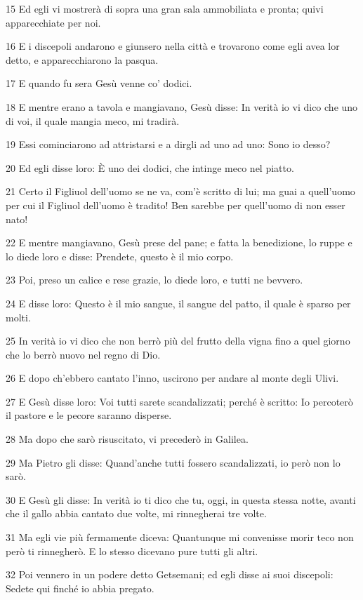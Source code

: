 \par 15 Ed egli vi mostrerà di sopra una gran sala ammobiliata e pronta; quivi apparecchiate per noi.
\par 16 E i discepoli andarono e giunsero nella città e trovarono come egli avea lor detto, e apparecchiarono la pasqua.
\par 17 E quando fu sera Gesù venne co' dodici.
\par 18 E mentre erano a tavola e mangiavano, Gesù disse: In verità io vi dico che uno di voi, il quale mangia meco, mi tradirà.
\par 19 Essi cominciarono ad attristarsi e a dirgli ad uno ad uno: Sono io desso?
\par 20 Ed egli disse loro: È uno dei dodici, che intinge meco nel piatto.
\par 21 Certo il Figliuol dell'uomo se ne va, com'è scritto di lui; ma guai a quell'uomo per cui il Figliuol dell'uomo è tradito! Ben sarebbe per quell'uomo di non esser nato!
\par 22 E mentre mangiavano, Gesù prese del pane; e fatta la benedizione, lo ruppe e lo diede loro e disse: Prendete, questo è il mio corpo.
\par 23 Poi, preso un calice e rese grazie, lo diede loro, e tutti ne bevvero.
\par 24 E disse loro: Questo è il mio sangue, il sangue del patto, il quale è sparso per molti.
\par 25 In verità io vi dico che non berrò più del frutto della vigna fino a quel giorno che lo berrò nuovo nel regno di Dio.
\par 26 E dopo ch'ebbero cantato l'inno, uscirono per andare al monte degli Ulivi.
\par 27 E Gesù disse loro: Voi tutti sarete scandalizzati; perché è scritto: Io percoterò il pastore e le pecore saranno disperse.
\par 28 Ma dopo che sarò risuscitato, vi precederò in Galilea.
\par 29 Ma Pietro gli disse: Quand'anche tutti fossero scandalizzati, io però non lo sarò.
\par 30 E Gesù gli disse: In verità io ti dico che tu, oggi, in questa stessa notte, avanti che il gallo abbia cantato due volte, mi rinnegherai tre volte.
\par 31 Ma egli vie più fermamente diceva: Quantunque mi convenisse morir teco non però ti rinnegherò. E lo stesso dicevano pure tutti gli altri.
\par 32 Poi vennero in un podere detto Getsemani; ed egli disse ai suoi discepoli: Sedete qui finché io abbia pregato.
